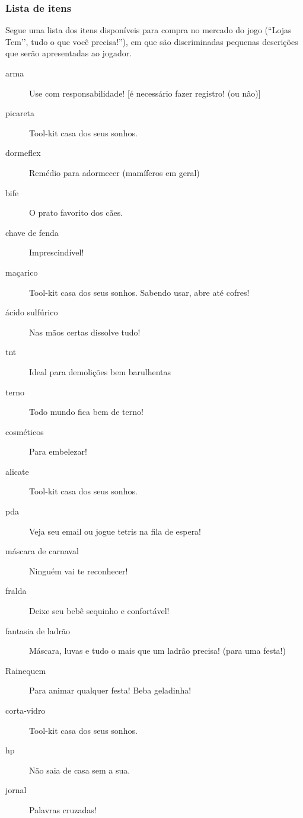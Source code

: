 \subsubsection{Lista de itens}

Segue uma lista dos itens disponíveis para compra no mercado do jogo (``Lojas Tem’’, tudo o que você precisa!''), em que são discriminadas pequenas descrições que serão apresentadas ao jogador.

\begin{description}
\item[arma] Use com responsabilidade! [é necessário fazer registro! (ou não)]
\item[picareta] Tool-kit casa dos seus sonhos.
\item[dormeflex] Remédio para adormecer (mamíferos em geral)
\item[bife] O prato favorito dos cães.
\item[chave de fenda] Imprescindível!
\item[maçarico] Tool-kit casa dos seus sonhos. Sabendo usar, abre até cofres!
\item[ácido sulfúrico] Nas mãos certas dissolve tudo!
\item[tnt] Ideal para demolições bem barulhentas
\item[terno] Todo mundo fica bem de terno!
\item[cosméticos] Para embelezar!
\item[alicate] Tool-kit casa dos seus sonhos.
\item[pda] Veja seu email ou jogue tetris na fila de espera!
\item[máscara de carnaval] Ninguém vai te reconhecer!
\item[fralda] Deixe seu bebê sequinho e confortável!
\item[fantasia de ladrão] Máscara, luvas e tudo o mais que um ladrão precisa! (para uma festa!)
\item[Rainequem] Para animar qualquer festa! Beba geladinha!
\item[corta-vidro] Tool-kit casa dos seus sonhos.
\item[hp] Não saia de casa sem a sua.
\item[jornal] Palavras cruzadas!
\end{description}

